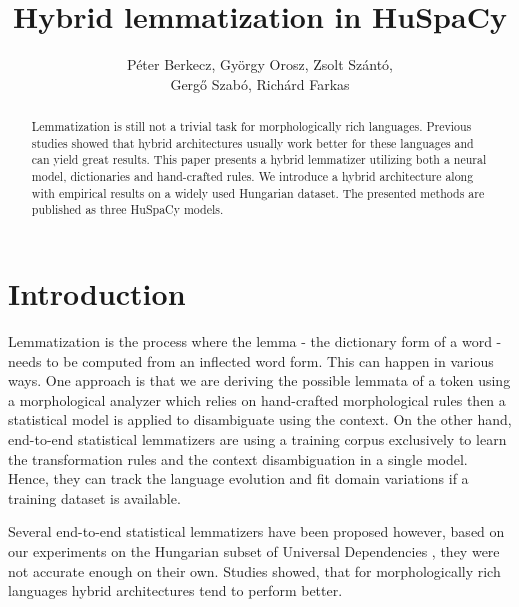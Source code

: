 \documentclass{llncs}
\begin{document}


\title{Hybrid lemmatization in HuSpaCy}


\author{Péter Berkecz, György Orosz, Zsolt Szántó,\\
Gergő Szabó, Richárd Farkas
}


\maketitle

\begin{abstract}
Lemmatization is still not a trivial task for morphologically rich languages. Previous studies showed that hybrid architectures usually work better for these languages and can yield great results. This paper presents a hybrid lemmatizer utilizing both a neural model, dictionaries and hand-crafted rules. We introduce a hybrid architecture along with empirical results on a widely used Hungarian dataset. The presented methods are published as three HuSpaCy models.
\end{abstract}

\section{Introduction}

Lemmatization is the process where the lemma - the dictionary form of a word - needs to be computed from an inflected word form. This can happen in various ways. One approach is that we are deriving the possible lemmata of a token using a morphological analyzer which relies on hand-crafted morphological rules then a statistical model is applied to disambiguate using the context. 
On the other hand, end-to-end statistical lemmatizers are using a training corpus exclusively to learn the transformation rules and the context disambiguation in a single model. Hence, they can track the language evolution and fit domain variations if a training dataset is available.

Several end-to-end statistical lemmatizers have been proposed \citep{muller-etal-2015-joint, udpipe} however, based on our experiments on the Hungarian subset of Universal Dependencies \citep{nivre2017universal}, they were not accurate enough on their own. Studies \citep{purepos,boudchiche2019hybrid} showed, that for morphologically rich languages hybrid architectures tend to perform better.
\end{document}
